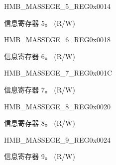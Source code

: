 \begin{register}{H}{MB\_MASSEGE\_5\_REG}{0x0014}\label{regdesc:MBMESSAGE5REG}
%
\regnewline%
\begin{regdesc}\begin{reglist}
\label{fielddesc:MBMESSAGE5}\item [MB\_MASSEGE\_5] 信息寄存器 5。 (R/W)
\end{reglist}\end{regdesc}
\end{register}


\begin{register}{H}{MB\_MASSEGE\_6\_REG}{0x0018}\label{regdesc:MBMESSAGE6REG}
%
\regnewline%
\begin{regdesc}\begin{reglist}
\label{fielddesc:MBMESSAGE6}\item [MB\_MASSEGE\_6] 信息寄存器 6。 (R/W)
\end{reglist}\end{regdesc}
\end{register}


\begin{register}{H}{MB\_MASSEGE\_7\_REG}{0x001C}\label{regdesc:MBMESSAGE7REG}
%
\regnewline%
\begin{regdesc}\begin{reglist}
\label{fielddesc:MBMESSAGE7}\item [MB\_MASSEGE\_7] 信息寄存器 7。 (R/W)
\end{reglist}\end{regdesc}
\end{register}


\begin{register}{H}{MB\_MASSEGE\_8\_REG}{0x0020}\label{regdesc:MBMESSAGE8REG}
%
\regnewline%
\begin{regdesc}\begin{reglist}
\label{fielddesc:MBMESSAGE8}\item [MB\_MASSEGE\_8] 信息寄存器 8。 (R/W)
\end{reglist}\end{regdesc}
\end{register}


\begin{register}{H}{MB\_MASSEGE\_9\_REG}{0x0024}\label{regdesc:MBMESSAGE9REG}
%
\regnewline%
\begin{regdesc}\begin{reglist}
\label{fielddesc:MBMESSAGE9}\item [MB\_MASSEGE\_9] 信息寄存器 9。 (R/W)
\end{reglist}\end{regdesc}
\end{register}


